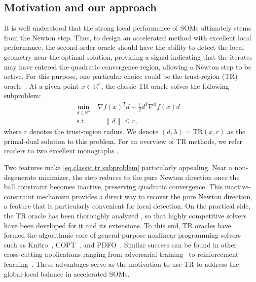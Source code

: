 \documentclass{article}
\numberwithin{equation}{section}
\newcommand{\tr}{\textrm{TR}}
\numberwithin{equation}{section}
\begin{document}
\subsection{Motivation and our approach}\label{sec.motivation}
It is well understood that the strong local performance of SOMs ultimately stems from the Newton step. Thus, to design an accelerated method with excellent local performance, the second-order oracle should have the ability to detect the local geometry near the optimal solution, providing a signal indicating that the iterates may have
entered the quadratic convergence region, allowing a Newton step to be active.
For this purpose, one particular choice could be the trust-region (TR) oracle~\cite{more1983recent,conn2000trust}. At a given point \( x \in \mathbb{R}^n \), the classic TR oracle solves the following subproblem:
\begin{equation}
    \label{eq.classic tr subproblem}
    \begin{aligned}
        \underset{d \in \mathbb{R}^n}{\min}~ & \nabla f(x)^T d + \tfrac{1}{2} d^T \nabla^2 f(x)  d \\
        \text{s.t.}                          & \quad  \|d\| \le r,
    \end{aligned}
\end{equation}
where \( r \) denotes the trust-region radius. We denote $(d,\lambda) = \tr(x, r)$ as the primal-dual solution to this problem. For an overview of TR methods, we refer readers to two excellent monographs \cite{yuan2000review,yuan2015recent}.

Two features make \eqref{eq.classic tr subproblem} particularly appealing. Near a non-degenerate minimizer, the step reduces to the pure Newton direction once the ball constraint becomes inactive, preserving quadratic convergence. This inactive-constraint mechanism provides a direct way to recover the pure Newton direction, a feature that is particularly convenient for local detection.
On the practical side, the TR oracle has been thoroughly analyzed \cite{jiang2022holderian,rojas2001new,honguyen2017second,wang2022generalized,so2007on,so2011deterministic}, so that highly competitive solvers have been developed \cite{rojas2001new, adachi2017solving, adachi2019eigenvalue} for it and its extensions.
To this end, TR oracles have formed the algorithmic core of general-purpose nonlinear programming solvers such as Knitro~\cite{byrd2006knitro}, COPT~\cite{ge2022cardinal}, and PDFO~\cite{ragonneau2024pdfo}. Similar success can be found in other cross-cutting applications ranging from adversarial training~\cite{yao2019trust} to reinforcement learning~\cite{schulman2015trust}. These advantages serve as the motivation to use \tr{} to address the global-local balance in accelerated SOMs.
\end{document}
